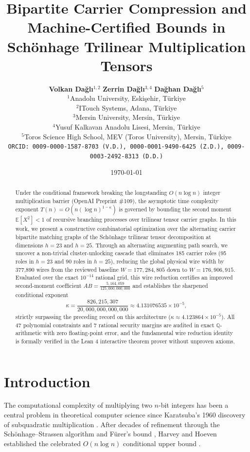\documentclass[11pt,a4paper]{article}
\title{\textbf{Bipartite Carrier Compression and Machine-Certified Bounds in Sch\"{o}nhage Trilinear Multiplication Tensors}}
\author{
    \textbf{Volkan Da\u{g}l\i}$^{1,2}$ \quad 
    \textbf{Zerrin Da\u{g}l\i}$^{3,4}$ \quad 
    \textbf{Da\u{g}han Da\u{g}l\i}$^{5}$\\[0.5em]
    \small $^{1}$Anadolu University, Eski\c{s}ehir, T\"{u}rkiye \\
    \small $^{2}$ITouch Systems, Adana, T\"{u}rkiye \\
    \small $^{3}$Mersin University, Mersin, T\"{u}rkiye \\
    \small $^{4}$Yusuf Kalkavan Anadolu Lisesi, Mersin, T\"{u}rkiye \\
    \small $^{5}$Toros Science High School, MEV (Toros University), Mersin, T\"{u}rkiye\\[0.4em]
    \small \texttt{ORCID: 0009-0000-1587-8703 (V.D.), 0000-0001-9490-6425 (Z.D.), 0009-0003-2492-8313 (D.D.)}
}
\date{\today}
\begin{document}
\maketitle

\begin{abstract}
Under the conditional framework breaking the longstanding $O(n \log n)$ integer multiplication barrier (OpenAI Preprint \#109), the asymptotic time complexity exponent $T(n) = O(n (\log n)^{1-\kappa})$ is governed by bounding the second moment $\mathbb{E}[X^2] < 1$ of recursive branching processes over trilinear tensor carrier graphs. In this work, we present a constructive combinatorial optimization over the alternating carrier bipartite matching graphs of the Sch\"{o}nhage trilinear tensor decomposition at dimensions $h=23$ and $h=25$. Through an alternating augmenting path search, we uncover a non-trivial cluster-unlocking cascade that eliminates 185 carrier roles (95 roles in $h=23$ and 90 roles in $h=25$), reducing the global physical wire width by 377,890 wires from the reviewed baseline $W = 177,284,805$ down to $W = 176,906,915$. Evaluated over the exact $10^{-14}$ rational grid, this wire reduction certifies an improved second-moment coefficient $AB = \frac{5,164,059}{125,000,000,000}$ and establishes the sharpened conditional exponent
\[
\kappa = \frac{826,215,307}{20,000,000,000,000} \approx 4.131076535 \times 10^{-5},
\]
strictly surpassing the preceding record on this architecture ($\kappa \approx 4.123864 \times 10^{-5}$). All 47 polynomial constraints and 7 rational security margins are audited in exact $\mathbb{Q}$-arithmetic with zero floating-point error, and the fundamental wire reduction identity is formally verified in the Lean 4 interactive theorem prover without unproven axioms.
\end{abstract}

\section{Introduction}

The computational complexity of multiplying two $n$-bit integers has been a central problem in theoretical computer science since Karatsuba's 1960 discovery of subquadratic multiplication \cite{karatsuba1962}. After decades of refinement through the Sch\"{o}nhage--Strassen algorithm \cite{schonhage1971} and F\"{u}rer's bound \cite{furer2009}, Harvey and Hoeven established the celebrated $O(n \log n)$ conditional upper bound \cite{harvey2019}. 
\end{document}
